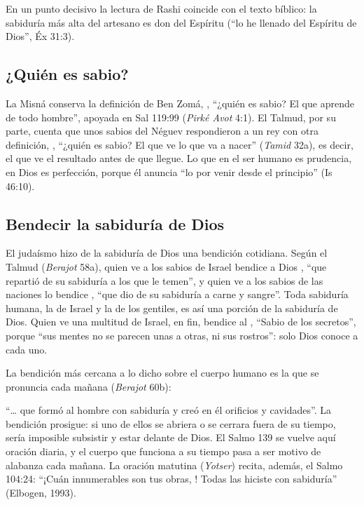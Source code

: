 En un punto decisivo la lectura de Rashi coincide con el texto bíblico: la sabiduría más alta del artesano es don del Espíritu (``lo he llenado del Espíritu de Dios'', Éx 31:3).

\subsection{¿Quién es sabio?}

La Misná conserva la definición de Ben Zomá, , ``¿quién es sabio? El que aprende de todo hombre'', apoyada en Sal 119:99 (\emph{Pirké Avot} 4:1). El Talmud, por su parte, cuenta que unos sabios del Néguev respondieron a un rey con otra definición, , ``¿quién es sabio? El que ve lo que va a nacer'' (\emph{Tamid} 32a), es decir, el que ve el resultado antes de que llegue. Lo que en el ser humano es prudencia, en Dios es perfección, porque él anuncia ``lo por venir desde el principio'' (Is 46:10).

\subsection{Bendecir la sabiduría de Dios}

El judaísmo hizo de la sabiduría de Dios una bendición cotidiana. Según el Talmud (\emph{Berajot} 58a), quien ve a los sabios de Israel bendice a Dios , ``que repartió de su sabiduría a los que le temen'', y quien ve a los sabios de las naciones lo bendice , ``que dio de su sabiduría a carne y sangre''. Toda sabiduría humana, la de Israel y la de los gentiles, es así una porción de la sabiduría de Dios. Quien ve una multitud de Israel, en fin, bendice al , ``Sabio de los secretos'', porque ``sus mentes no se parecen unas a otras, ni sus rostros'': solo Dios conoce a cada uno.

La bendición más cercana a lo dicho sobre el cuerpo humano es la que se pronuncia cada mañana (\emph{Berajot} 60b):


``\ldots{} que formó al hombre con sabiduría y creó en él orificios y cavidades''. La bendición prosigue: si uno de ellos se abriera o se cerrara fuera de su tiempo, sería imposible subsistir y estar delante de Dios. El Salmo 139 se vuelve aquí oración diaria, y el cuerpo que funciona a su tiempo pasa a ser motivo de alabanza cada mañana. La oración matutina (\emph{Yotser}) recita, además, el Salmo 104:24: ``¡Cuán innumerables son tus obras, \SENOR! Todas las hiciste con sabiduría'' (Elbogen, 1993).


